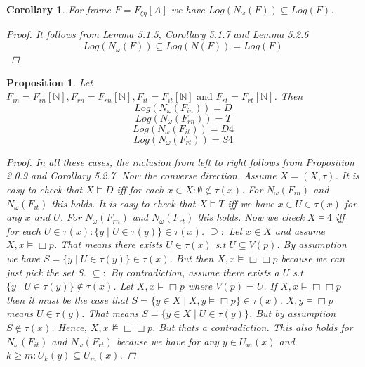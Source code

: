 \documentclass[12pt, a4paper]{scrartcl}
\newtheorem{proposition}[definition]{Proposition}
\newtheorem{corollary}[definition]{Corollary}
\begin{document}
\begin{corollary}
    For frame $F = F_{\xi \eta}[A]$ we have $Log(N_\omega(F)) \subseteq Log(F)$.
    \begin{proof}
        It follows from Lemma 5.1.5, Corollary 5.1.7 and Lemma 5.2.6 
        $$Log(N_\omega(F)) \subseteq Log(N(F)) = Log(F)$$
    \end{proof}

\end{corollary}

\begin{proposition}
    Let $F_{in} = F_{in}[\mathbb{N}], F_{rn} = F_{rn}[\mathbb{N}], F_{it} = F_{it}[\mathbb{N}] \mbox{ and } F_{rt} = F_{rt}[\mathbb{N}]$. Then
    $$Log(N_\omega(F_{in})) = D$$
    $$Log(N_\omega(F_{rn})) = T$$
    $$Log(N_\omega(F_{it})) = D4$$
    $$Log(N_\omega(F_{rt})) = S4$$

    \begin{proof}
        In all these cases, the inclusion from left to right follows from Proposition 2.0.9 and Corollary 5.2.7.
        Now the converse direction. Assume $X =(X,\tau)$. \newline
        It is easy to check that $X \vDash D$ iff for each $x \in X : \emptyset \notin \tau(x)$. For $N_\omega(F_{in})$ and $N_\omega(F_{it})$ this holds. \newline
        It is easy to check that $X \vDash T$ iff we have $x\in U \in \tau(x)$ for any $x$ and $U$. For $N_\omega(F_{rn})$ and $N_\omega(F_{rt})$ this holds. \newline
        Now we check $X \vDash 4$ iff for each $U \in \tau(x) : \{y \mid U \in \tau(y)\} \in \tau(x)$. \newline
        $\supseteq : $ Let $x \in X$ and assume $X,x \vDash \Box p$. That means there exists $U \in \tau(x)$ s.t $U\subseteq V(p)$.
        By assumption we have $S = \{y \mid U \in \tau(y)\} \in \tau(x)$. But then $X,x \vDash \Box\Box p$ because we can just pick the set S. \newline
        $\subseteq :$ By contradiction, assume there exists a $U$ s.t $\{y \mid U \in \tau(y)\} \notin \tau(x)$. Let $X,x \vDash \Box p$ where $V(p) = U$.
        If $X,x \vDash \Box\Box p$ then it must be the case that  \newline 
        $S =\{y \in X \mid X,y \vDash \Box p\} \in \tau(x)$. $X,y \vDash \Box p$ means $U \in \tau(y)$. That means $S = \{y \in X \mid U \in \tau(y)\}$. But by assumption $S \notin \tau(x)$. 
        Hence, $X,x \not\vDash \Box\Box p$. But thats a contradiction. This also holds for $N_\omega(F_{it})$ and $N_\omega(F_{rt})$ because we have for any $y \in U_m(x)$ and 
        $k \geq m : U_k(y) \subseteq U_m(x)$.
            
    \end{proof}
\end{proposition}
\end{document}
